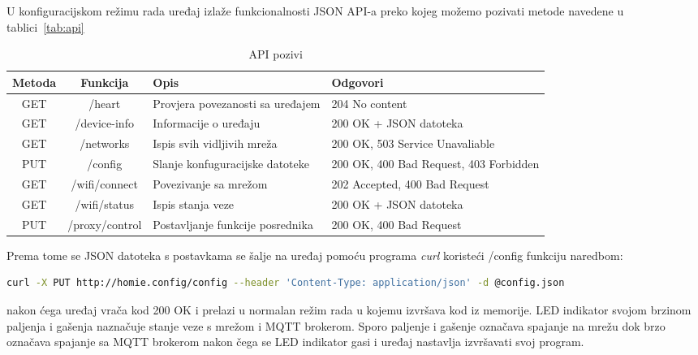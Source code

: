\documentclass[times, utf8, zavrsni]{fer}
\begin{document}
U konfiguracijskom režimu rada uređaj izlaže funkcionalnosti JSON API-a preko kojeg možemo pozivati metode navedene u tablici~\ref{tab:api}
\begin{center}
    \begin{table}[h]
        \begin{tabular}{ |c|c|p{4cm}|p{4cm}| }
            \hline
            Metoda & Funkcija & Opis & Odgovori\\
            \hline
            GET & /heart & Provjera povezanosti sa uređajem & 204 No content \\
            \hline
            GET & /device-info & Informacije o uređaju & 200 OK + JSON datoteka\\
            \hline
            GET & /networks & Ispis svih vidljivih mreža & 200 OK, 503 Service Unavaliable \\
            \hline
            PUT & /config & Slanje konfuguracijske datoteke & 200 OK, 400 Bad Request, 403 Forbidden\\
            \hline
            GET & /wifi/connect & Povezivanje sa mrežom & 202 Accepted, 400 Bad Request\\
            \hline
            GET & /wifi/status & Ispis stanja veze & 200 OK + JSON datoteka\\
            \hline
            PUT & /proxy/control & Postavljanje funkcije posrednika & 200 OK, 400 Bad Request\\
            \hline
        \end{tabular}
        \caption{API pozivi}
        \label{tab:API}
    \end{table}
\end{center}
Prema tome se JSON datoteka s postavkama se šalje na uređaj pomoću programa \textit{curl} koristeći /config funkciju naredbom:
\begin{lstlisting}[language=Bash]
curl -X PUT http://homie.config/config --header 'Content-Type: application/json' -d @config.json
\end{lstlisting}

nakon ćega uređaj vrača kod 200 OK i prelazi u normalan režim rada u kojemu izvršava kod iz memorije.
LED indikator svojom brzinom paljenja i gašenja naznačuje stanje veze s mrežom i MQTT brokerom.
Sporo paljenje i gašenje označava spajanje na mrežu dok brzo označava spajanje sa MQTT brokerom nakon čega se LED indikator gasi i uređaj nastavlja izvršavati svoj program.


\end{document}
